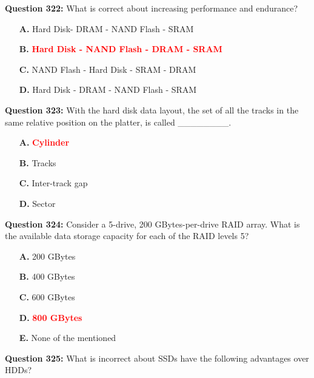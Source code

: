 \documentclass[12pt,a4paper]{article}
\begin{document}
\vspace{0.5cm}

\textbf{Question 322:} What is correct about increasing performance and endurance?

\begin{itemize}
    \item[\textbf{A.}] Hard Disk- DRAM - NAND Flash - SRAM
    \item[\textbf{B.}] \textcolor{red}{\textbf{Hard Disk - NAND Flash - DRAM - SRAM}}
    \item[\textbf{C.}] NAND Flash - Hard Disk - SRAM - DRAM
    \item[\textbf{D.}] Hard Disk - DRAM - NAND Flash - SRAM
\end{itemize}

\vspace{0.5cm}

\textbf{Question 323:} With the hard disk data layout, the set of all the tracks in the same relative position on the platter, is called ________.

\begin{itemize}
    \item[\textbf{A.}] \textcolor{red}{\textbf{Cylinder}}
    \item[\textbf{B.}] Tracks
    \item[\textbf{C.}] Inter-track gap
    \item[\textbf{D.}] Sector
\end{itemize}

\vspace{0.5cm}

\textbf{Question 324:} Consider a 5-drive, 200 GBytes-per-drive RAID array. What is the available data storage capacity for each of the RAID levels 5?

\begin{itemize}
    \item[\textbf{A.}] 200 GBytes
    \item[\textbf{B.}] 400 GBytes
    \item[\textbf{C.}] 600 GBytes
    \item[\textbf{D.}] \textcolor{red}{\textbf{800 GBytes}}
    \item[\textbf{E.}] None of the mentioned
\end{itemize}

\vspace{0.5cm}

\textbf{Question 325:} What is incorrect about SSDs have the following advantages over HDDs?
\end{document}
